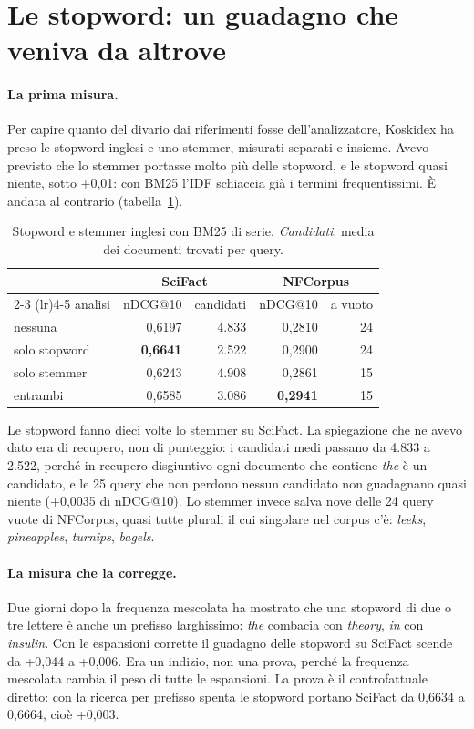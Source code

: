 \section{Le stopword: un guadagno che veniva da altrove}\label{sec:stopword}

\paragraph{La prima misura.} Per capire quanto del divario dai riferimenti fosse
dell'analizzatore, Koskidex ha preso le stopword inglesi e uno stemmer, misurati
separati e insieme. Avevo previsto che lo stemmer portasse molto più delle
stopword, e le stopword quasi niente, sotto +0,01: con BM25 l'IDF schiaccia già i
termini frequentissimi. È andata al contrario (tabella~\ref{tab:stopword}).

\begin{table}[ht]
  \centering
  \begin{tabular}{lrrrr}
    \toprule
    & \multicolumn{2}{c}{SciFact} & \multicolumn{2}{c}{NFCorpus} \\
    \cmidrule(lr){2-3} \cmidrule(lr){4-5}
    analisi & nDCG@10 & candidati & nDCG@10 & a vuoto \\
    \midrule
    nessuna & 0,6197 & 4.833 & 0,2810 & 24 \\
    solo stopword & \textbf{0,6641} & 2.522 & 0,2900 & 24 \\
    solo stemmer & 0,6243 & 4.908 & 0,2861 & 15 \\
    entrambi & 0,6585 & 3.086 & \textbf{0,2941} & 15 \\
    \bottomrule
  \end{tabular}
  \caption{Stopword e stemmer inglesi con BM25 di serie. \emph{Candidati}: media
  dei documenti trovati per query.}
  \label{tab:stopword}
\end{table}

Le stopword fanno dieci volte lo stemmer su SciFact. La spiegazione che ne avevo
dato era di recupero, non di punteggio: i candidati medi passano da 4.833 a 2.522,
perché in recupero disgiuntivo ogni documento che contiene \emph{the} è un
candidato, e le 25 query che non perdono nessun candidato non guadagnano quasi
niente (+0,0035 di nDCG@10). Lo stemmer invece salva nove delle 24 query vuote di NFCorpus, quasi tutte plurali il cui
singolare nel corpus c'è: \emph{leeks}, \emph{pineapples}, \emph{turnips},
\emph{bagels}.

\paragraph{La misura che la corregge.} Due giorni dopo la frequenza mescolata ha
mostrato che una stopword di due o tre lettere è anche un prefisso larghissimo:
\emph{the} combacia con \emph{theory}, \emph{in} con \emph{insulin}. Con le
espansioni corrette il guadagno delle stopword su SciFact scende da +0,044 a
+0,006. Era un indizio, non una prova, perché la frequenza mescolata cambia il peso
di tutte le espansioni. La prova è il controfattuale diretto: con la ricerca per
prefisso spenta le stopword portano SciFact da 0,6634 a 0,6664, cioè +0,003.

